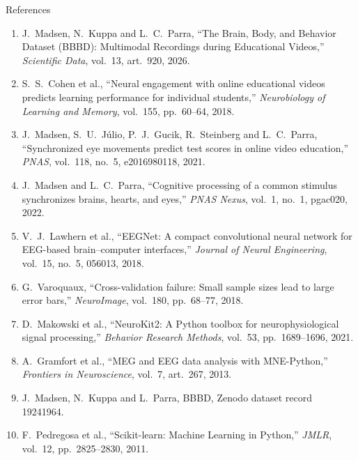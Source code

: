 \documentclass[aspectratio=169,10pt]{beamer}
\begin{document}
\begin{frame}{References}
  \scriptsize
  \begin{enumerate}
    \item J.\ Madsen, N.\ Kuppa and L.\ C.\ Parra, ``The Brain, Body, and
      Behavior Dataset (BBBD): Multimodal Recordings during Educational
      Videos,'' \emph{Scientific Data}, vol.\ 13, art.\ 920, 2026.
    \item S.\ S.\ Cohen et al., ``Neural engagement with online educational
      videos predicts learning performance for individual students,''
      \emph{Neurobiology of Learning and Memory}, vol.\ 155, pp.\ 60--64, 2018.
    \item J.\ Madsen, S.\ U.\ Júlio, P.\ J.\ Gucik, R.\ Steinberg and
      L.\ C.\ Parra, ``Synchronized eye movements predict test scores in
      online video education,'' \emph{PNAS}, vol.\ 118, no.\ 5, e2016980118,
      2021.
    \item J.\ Madsen and L.\ C.\ Parra, ``Cognitive processing of a common
      stimulus synchronizes brains, hearts, and eyes,'' \emph{PNAS Nexus},
      vol.\ 1, no.\ 1, pgac020, 2022.
    \item V.\ J.\ Lawhern et al., ``EEGNet: A compact convolutional neural
      network for EEG-based brain--computer interfaces,'' \emph{Journal of
      Neural Engineering}, vol.\ 15, no.\ 5, 056013, 2018.
    \item G.\ Varoquaux, ``Cross-validation failure: Small sample sizes lead
      to large error bars,'' \emph{NeuroImage}, vol.\ 180, pp.\ 68--77, 2018.
    \item D.\ Makowski et al., ``NeuroKit2: A Python toolbox for
      neurophysiological signal processing,'' \emph{Behavior Research
      Methods}, vol.\ 53, pp.\ 1689--1696, 2021.
    \item A.\ Gramfort et al., ``MEG and EEG data analysis with MNE-Python,''
      \emph{Frontiers in Neuroscience}, vol.\ 7, art.\ 267, 2013.
    \item J.\ Madsen, N.\ Kuppa and L.\ Parra, BBBD, Zenodo dataset record
      19241964.
    \item F.\ Pedregosa et al., ``Scikit-learn: Machine Learning in Python,''
      \emph{JMLR}, vol.\ 12, pp.\ 2825--2830, 2011.
  \end{enumerate}
\end{frame}

\makeoutro
\end{document}
